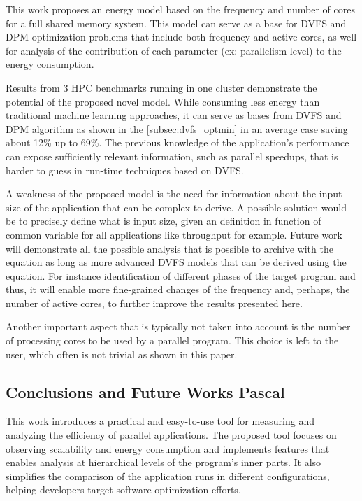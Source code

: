 This work proposes an energy model based on the frequency and number of cores for a full shared memory system. This model can serve as a base for DVFS and DPM optimization problems that include both frequency and active cores, as well for analysis of the contribution of each parameter (ex: parallelism level) to the energy consumption.

Results from 3 HPC benchmarks running in one cluster demonstrate the potential of the proposed novel model. While consuming less energy than traditional machine learning approaches, it can serve as bases from DVFS and DPM algorithm as shown in the \ref{subsec:dvfs_optmin} in an average case saving about 12\% up to 69\%. The previous knowledge of the application's performance can expose sufficiently relevant information, such as parallel speedups, that is harder to guess in run-time techniques based on DVFS.

A weakness of the proposed model is the need for information about the input size of the application that can be complex to derive. A possible solution would be to precisely define what is input size, given an definition in function of common variable for all applications like throughput for example. Future work will demonstrate all the possible analysis that is possible to archive with the equation as long as more advanced DVFS models that can be derived using the equation. For instance identification of different phases of the target program and thus, it will enable more fine-grained changes of the frequency and, perhaps, the number of active cores, to further improve the results presented here.

Another important aspect that is typically not taken into account is the number of processing cores to be used by a parallel program. This choice is left to the user, which often is not trivial as shown in this paper.


\subsection{Conclusions and Future Works Pascal} \label{sec:conclusions_pascal}

This work introduces a practical and easy-to-use tool for measuring and analyzing the efficiency of parallel applications. The proposed tool focuses on observing scalability and energy consumption and implements features that enables analysis at hierarchical levels of the program's inner parts. It also simplifies the comparison of the application runs in different configurations, helping developers target software optimization efforts.

